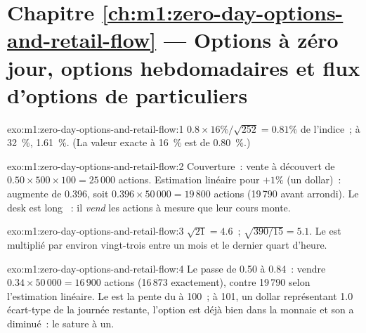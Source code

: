 \section*{Chapitre \ref{ch:m1:zero-day-options-and-retail-flow} --- Options à zéro jour, options hebdomadaires et flux d'options de particuliers}

\begin{solution}{exo:m1:zero-day-options-and-retail-flow:1}
$0.8 \times 16\%/\sqrt{252} = 0.81\%$ de l'indice~; à 32~\%, 1.61~\%. (La
valeur exacte à 16~\% est de 0.80~\%.)
\end{solution}

\begin{solution}{exo:m1:zero-day-options-and-retail-flow:2}
Couverture~: vente à découvert de $0.50 \times 500 \times 100 = 25\,000$ actions. Estimation linéaire pour
$+1\%$ (un dollar)~:  augmente de 0.396, soit $0.396 \times 50\,000 =
19\,800$ actions (19\,790 avant arrondi). Le desk est long ~: il \emph{vend}
les actions à mesure que leur cours monte.
\end{solution}

\begin{solution}{exo:m1:zero-day-options-and-retail-flow:3}
$\sqrt{21} = 4.6$~; $\sqrt{390/15} = 5.1$. Le  est multiplié par environ vingt-trois
entre un mois et le dernier quart d'heure.
\end{solution}

\begin{solution}{exo:m1:zero-day-options-and-retail-flow:4}
Le  passe de 0.50 à 0.84~: vendre $0.34 \times 50\,000 = 16\,900$ actions
(16\,873 exactement), contre 19\,790 selon l'estimation linéaire. Le  est la pente
du  à 100~; à 101, un dollar représentant 1.0 écart-type de la
journée restante, l'option est déjà bien dans la monnaie et son  a
diminué~: le  sature à un.
\end{solution}

